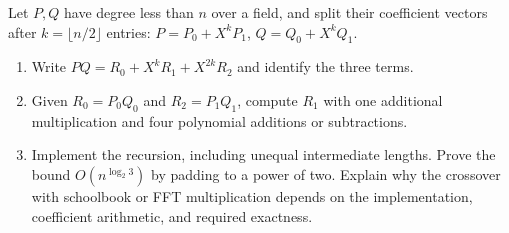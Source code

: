 
\begin{exo}
\label{exo-algo-karatsuba}
Let $P,Q$ have degree less than $n$ over a field, and split their coefficient
vectors after $k=\lfloor n/2\rfloor$ entries:
$P=P_0+X^kP_1$, $Q=Q_0+X^kQ_1$.
\begin{enumerate}
\item Write $PQ=R_0+X^kR_1+X^{2k}R_2$ and identify the three terms.
\item Given $R_0=P_0Q_0$ and $R_2=P_1Q_1$, compute $R_1$ with one
additional multiplication and four polynomial additions or subtractions.
\item Implement the recursion, including unequal intermediate lengths.
Prove the bound $O(n^{\log_2 3})$ by padding to a power of two.
Explain why the crossover with schoolbook or FFT multiplication depends on
the implementation, coefficient arithmetic, and required exactness.
\end{enumerate}
\end{exo}


